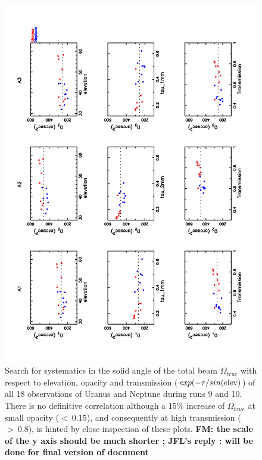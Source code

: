 \begin{figure}[p]
\begin{center}
  \includegraphics[clip, angle=-90, scale=0.6]{Figures/Omega_True_vs_elev_tau_transmission.pdf}
  \caption{Search for systematics in the solid angle of the total beam $\Omega_{true}$
   with respect to elevation, opacity and transmission
   ($exp(-\tau/sin({\rm elev})$) of all 18 observations
   of Uranus and Neptune during runs 9 and 10. There is no definitive correlation although a 15\% increase
   of $\Omega_{true}$ at small opacity ($<~0.15$), and consequently
  at high transmission ($>~0.8$), is hinted by close inspection of these plots. {\bf FM: the scale of the
    y axis should be much shorter ; JFL's reply : will be done for final
    version of document}}
\label{fig:Osystematics}
\end{center}
\end{figure}


